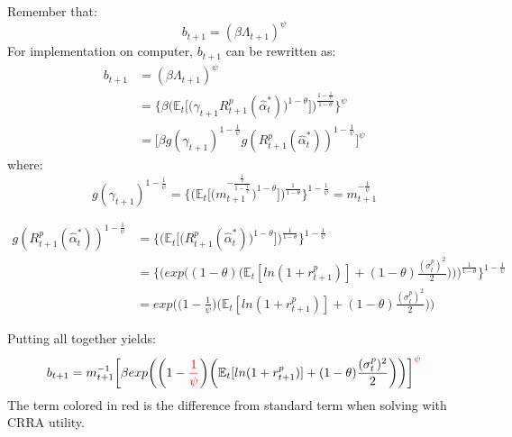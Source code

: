 \documentclass[12pt,a4paper]{article}
\begin{document}
Remember that: 
\begin{equation*}
    b_{t+1}=(\beta\Lambda_{t+1})^\psi
\end{equation*}
For implementation on computer, $b_{t+1}$ can be rewritten as:
\begin{align*}
    b_{t+1} &= (\beta\Lambda_{t+1})^\psi\\
        &= \Bigg\{\beta \bigg(\mathbb{E}_t\bigg[\big(\gamma_{t+1}R^{p}_{t+1}(\hat{\alpha}_t^*)\big)^{1-\theta}\bigg]\bigg)^\frac{1-\frac{1}{\psi}}{1-\theta}\Bigg\}^\psi\\
        &= \bigg[\beta g(\gamma_{t+1})^{1-\frac{1}{\psi}}g(R_{t+1}^p(\hat{\alpha}_t^*))^{1-\frac{1}{\psi}}\bigg]^\psi
\end{align*}
where: 
\begin{equation*}
  g(\gamma_{t+1})^{1-\frac{1}{\psi}}= \Bigg\{ \Bigg(\mathbb{E}_t\bigg[ \big(m_{t+1}^{-\frac{\frac{1}{\psi}}{1-\frac{1}{\psi}}}\big)^{1-\theta}\bigg]\Bigg)^{\frac{1}{1-\theta}}\Bigg\}^{1-\frac{1}{\psi}}=m_{t+1}^{-\frac{1}{\psi}}
\end{equation*}

\begin{align*}
  g(R_{t+1}^p(\hat{\alpha}_t^*))^{1-\frac{1}{\psi}}&= \Bigg\{ \Bigg(\mathbb{E}_t\bigg[ \big(  R_{t+1}^p(\hat{\alpha}_t^*)          \big)^{1-\theta}\bigg]\Bigg)^{\frac{1}{1-\theta}}\Bigg\}^{1-\frac{1}{\psi}}\\
  &= \Bigg\{ \Bigg(  exp\bigg((1-\theta)\bigg(\mathbb{E}_t[ln(1+r^p_{t+1})]+(1-\theta)\frac{(\sigma_t^p)^2}{2}\bigg)\bigg)      \Bigg)^{\frac{1}{1-\theta}}\Bigg\}^{1-\frac{1}{\psi}}\\
  &= exp\bigg(\bigg(1-\frac{1}{\psi}\bigg)\bigg(\mathbb{E}_t[ln(1+r^p_{t+1})]+(1-\theta)\frac{(\sigma_t^p)^2}{2}\bigg)\bigg)  
\end{align*}

Putting all together yields: 
\begin{equation*}
    b_{t+1}=m_{t+1}^{-1}\bigg[\beta  exp\bigg(\bigg(1-\textcolor{red}{\frac{1}{\psi}}\bigg)\bigg(\mathbb{E}_t[ln(1+r^p_{t+1})]+(1-\theta)\frac{(\sigma_t^p)^2}{2}\bigg)\bigg)\bigg]^{\textcolor{red}{\psi}}
\end{equation*}
The term colored in red is the difference from standard term when solving with CRRA utility. 
\end{document}
